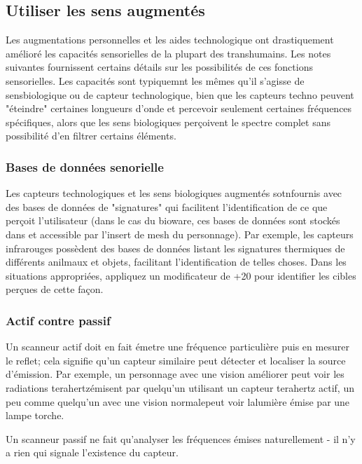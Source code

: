 {{\subsection{Utiliser les sens augmentés} \label{sec:using-enhanced-senses} 

Les augmentations personnelles et les aides technologique ont drastiquement amélioré les capacités sensorielles de la plupart des transhumains. Les notes suivantes fournissent certains détails sur les possibilités de ces fonctions sensorielles. Les capacités sont typiquemnt les mêmes qu'il s'agisse de sensbiologique ou de capteur technologique, bien que les capteurs techno peuvent "éteindre" certaines longueurs d'onde et percevoir seulement certaines fréquences spécifiques, alors que les sens biologiques perçoivent le spectre complet sans possibilité d'en filtrer certains éléments. 

\subsubsection{Bases de données senorielle} 

Les capteurs technologiques et les sens biologiques augmentés sotnfournis avec des bases de données de "signatures" qui facilitent l'identification de ce que perçoit l'utilisateur (dans le cas du bioware, ces bases de données sont stockés dans et accessible par l'insert de mesh du personnage). Par exemple, les capteurs infrarouges possèdent des bases de données listant les signatures thermiques de différents anilmaux et objets, facilitant l'identification de telles choses. Dans les situations appropriées, appliquez un modificateur de +20 pour identifier les cibles perçues de cette façon. 

\subsubsection{Actif contre passif} 

Un scanneur actif doit en fait émetre une fréquence particulière puis en mesurer le reflet; cela signifie qu'un capteur similaire peut détecter et localiser la source d'émission. Par exemple, un personnage avec une vision améliorer peut voir les radiations terahertzémisent par quelqu'un utilisant un capteur terahertz actif, un peu comme quelqu'un avec une vision normalepeut voir lalumière émise par une lampe torche. 

Un scanneur passif ne fait qu'analyser les fréquences émises naturellement - il n'y a rien qui signale l'existence du capteur. 

}}
